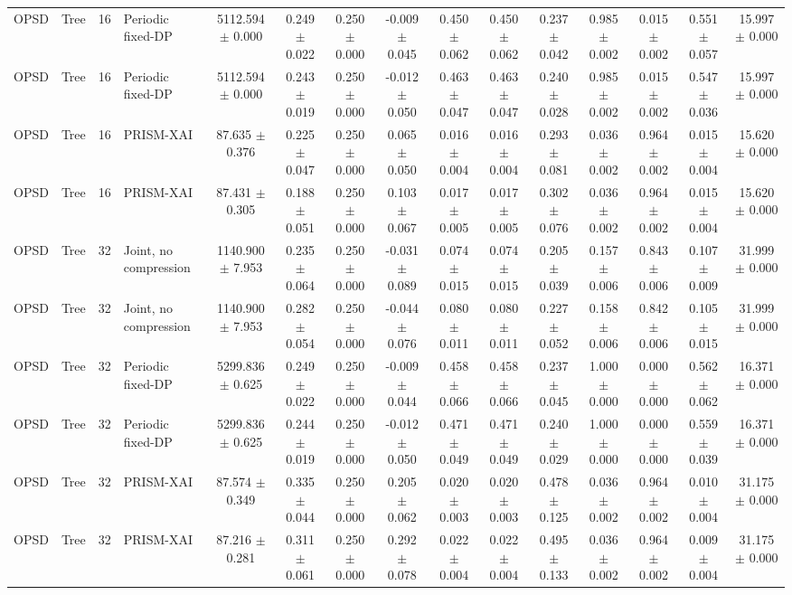\begin{tabular}{llllccccccccccc}
OPSD & Tree & 16 & Periodic fixed-DP & 5112.594 $\pm$ 0.000 & 0.249 $\pm$ 0.022 & 0.250 $\pm$ 0.000 & -0.009 $\pm$ 0.045 & 0.450 $\pm$ 0.062 & 0.450 $\pm$ 0.062 & 0.237 $\pm$ 0.042 & 0.985 $\pm$ 0.002 & 0.015 $\pm$ 0.002 & 0.551 $\pm$ 0.057 & 15.997 $\pm$ 0.000 \\
OPSD & Tree & 16 & Periodic fixed-DP & 5112.594 $\pm$ 0.000 & 0.243 $\pm$ 0.019 & 0.250 $\pm$ 0.000 & -0.012 $\pm$ 0.050 & 0.463 $\pm$ 0.047 & 0.463 $\pm$ 0.047 & 0.240 $\pm$ 0.028 & 0.985 $\pm$ 0.002 & 0.015 $\pm$ 0.002 & 0.547 $\pm$ 0.036 & 15.997 $\pm$ 0.000 \\
OPSD & Tree & 16 & PRISM-XAI & 87.635 $\pm$ 0.376 & 0.225 $\pm$ 0.047 & 0.250 $\pm$ 0.000 & 0.065 $\pm$ 0.050 & 0.016 $\pm$ 0.004 & 0.016 $\pm$ 0.004 & 0.293 $\pm$ 0.081 & 0.036 $\pm$ 0.002 & 0.964 $\pm$ 0.002 & 0.015 $\pm$ 0.004 & 15.620 $\pm$ 0.000 \\
OPSD & Tree & 16 & PRISM-XAI & 87.431 $\pm$ 0.305 & 0.188 $\pm$ 0.051 & 0.250 $\pm$ 0.000 & 0.103 $\pm$ 0.067 & 0.017 $\pm$ 0.005 & 0.017 $\pm$ 0.005 & 0.302 $\pm$ 0.076 & 0.036 $\pm$ 0.002 & 0.964 $\pm$ 0.002 & 0.015 $\pm$ 0.004 & 15.620 $\pm$ 0.000 \\
OPSD & Tree & 32 & Joint, no compression & 1140.900 $\pm$ 7.953 & 0.235 $\pm$ 0.064 & 0.250 $\pm$ 0.000 & -0.031 $\pm$ 0.089 & 0.074 $\pm$ 0.015 & 0.074 $\pm$ 0.015 & 0.205 $\pm$ 0.039 & 0.157 $\pm$ 0.006 & 0.843 $\pm$ 0.006 & 0.107 $\pm$ 0.009 & 31.999 $\pm$ 0.000 \\
OPSD & Tree & 32 & Joint, no compression & 1140.900 $\pm$ 7.953 & 0.282 $\pm$ 0.054 & 0.250 $\pm$ 0.000 & -0.044 $\pm$ 0.076 & 0.080 $\pm$ 0.011 & 0.080 $\pm$ 0.011 & 0.227 $\pm$ 0.052 & 0.158 $\pm$ 0.006 & 0.842 $\pm$ 0.006 & 0.105 $\pm$ 0.015 & 31.999 $\pm$ 0.000 \\
OPSD & Tree & 32 & Periodic fixed-DP & 5299.836 $\pm$ 0.625 & 0.249 $\pm$ 0.022 & 0.250 $\pm$ 0.000 & -0.009 $\pm$ 0.044 & 0.458 $\pm$ 0.066 & 0.458 $\pm$ 0.066 & 0.237 $\pm$ 0.045 & 1.000 $\pm$ 0.000 & 0.000 $\pm$ 0.000 & 0.562 $\pm$ 0.062 & 16.371 $\pm$ 0.000 \\
OPSD & Tree & 32 & Periodic fixed-DP & 5299.836 $\pm$ 0.625 & 0.244 $\pm$ 0.019 & 0.250 $\pm$ 0.000 & -0.012 $\pm$ 0.050 & 0.471 $\pm$ 0.049 & 0.471 $\pm$ 0.049 & 0.240 $\pm$ 0.029 & 1.000 $\pm$ 0.000 & 0.000 $\pm$ 0.000 & 0.559 $\pm$ 0.039 & 16.371 $\pm$ 0.000 \\
OPSD & Tree & 32 & PRISM-XAI & 87.574 $\pm$ 0.349 & 0.335 $\pm$ 0.044 & 0.250 $\pm$ 0.000 & 0.205 $\pm$ 0.062 & 0.020 $\pm$ 0.003 & 0.020 $\pm$ 0.003 & 0.478 $\pm$ 0.125 & 0.036 $\pm$ 0.002 & 0.964 $\pm$ 0.002 & 0.010 $\pm$ 0.004 & 31.175 $\pm$ 0.000 \\
OPSD & Tree & 32 & PRISM-XAI & 87.216 $\pm$ 0.281 & 0.311 $\pm$ 0.061 & 0.250 $\pm$ 0.000 & 0.292 $\pm$ 0.078 & 0.022 $\pm$ 0.004 & 0.022 $\pm$ 0.004 & 0.495 $\pm$ 0.133 & 0.036 $\pm$ 0.002 & 0.964 $\pm$ 0.002 & 0.009 $\pm$ 0.004 & 31.175 $\pm$ 0.000 \\
\bottomrule
\end{tabular}
